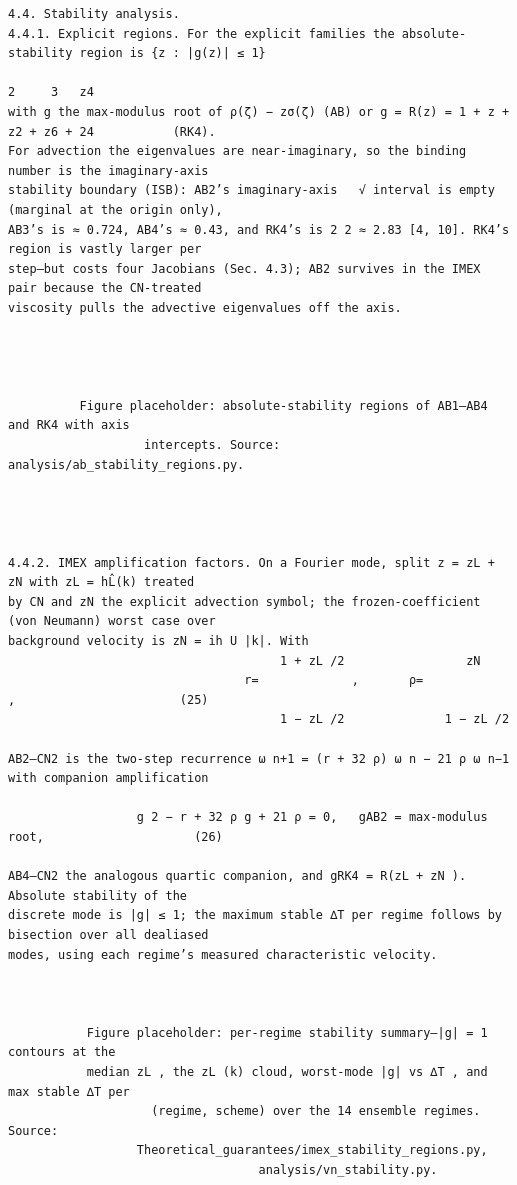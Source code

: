 \documentclass[letterpaper]{article}
\begin{document}
\begin{Verbatim}[fontsize=\fontsize{6.35}{7.15}\selectfont,breaklines=false]
4.4. Stability analysis.
4.4.1. Explicit regions. For the explicit families the absolute-stability region is {z : |g(z)| ≤ 1}
                                                                                 2     3   z4
with g the max-modulus root of ρ(ζ) − zσ(ζ) (AB) or g = R(z) = 1 + z + z2 + z6 + 24           (RK4).
For advection the eigenvalues are near-imaginary, so the binding number is the imaginary-axis
stability boundary (ISB): AB2’s imaginary-axis   √ interval is empty (marginal at the origin only),
AB3’s is ≈ 0.724, AB4’s ≈ 0.43, and RK4’s is 2 2 ≈ 2.83 [4, 10]. RK4’s region is vastly larger per
step—but costs four Jacobians (Sec. 4.3); AB2 survives in the IMEX pair because the CN-treated
viscosity pulls the advective eigenvalues off the axis.




          Figure placeholder: absolute-stability regions of AB1–AB4 and RK4 with axis
                   intercepts. Source: analysis/ab_stability_regions.py.




4.4.2. IMEX amplification factors. On a Fourier mode, split z = zL + zN with zL = hL̂(k) treated
by CN and zN the explicit advection symbol; the frozen-coefficient (von Neumann) worst case over
background velocity is zN = ih U |k|. With
                                      1 + zL /2                 zN
                                 r=             ,       ρ=             ,                       (25)
                                      1 − zL /2              1 − zL /2

AB2–CN2 is the two-step recurrence ω n+1 = (r + 32 ρ) ω n − 21 ρ ω n−1 with companion amplification
                                
                  g 2 − r + 32 ρ g + 21 ρ = 0,   gAB2 = max-modulus root,                     (26)

AB4–CN2 the analogous quartic companion, and gRK4 = R(zL + zN ). Absolute stability of the
discrete mode is |g| ≤ 1; the maximum stable ∆T per regime follows by bisection over all dealiased
modes, using each regime’s measured characteristic velocity.



           Figure placeholder: per-regime stability summary—|g| = 1 contours at the
           median zL , the zL (k) cloud, worst-mode |g| vs ∆T , and max stable ∆T per
                    (regime, scheme) over the 14 ensemble regimes. Source:
                  Theoretical_guarantees/imex_stability_regions.py,
                                   analysis/vn_stability.py.





\end{Verbatim}
\end{document}

